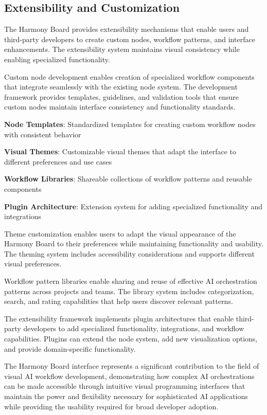 \subsection*{Extensibility and Customization}

The Harmony Board provides extensibility mechanisms that enable users and third-party developers to create custom nodes, workflow patterns, and interface enhancements. The extensibility system maintains visual consistency while enabling specialized functionality.

Custom node development enables creation of specialized workflow components that integrate seamlessly with the existing node system. The development framework provides templates, guidelines, and validation tools that ensure custom nodes maintain interface consistency and functionality standards.

\begin{expandedlist}
    \item \textbf{Node Templates}: Standardized templates for creating custom workflow nodes with consistent behavior
    \item \textbf{Visual Themes}: Customizable visual themes that adapt the interface to different preferences and use cases
    \item \textbf{Workflow Libraries}: Shareable collections of workflow patterns and reusable components
    \item \textbf{Plugin Architecture}: Extension system for adding specialized functionality and integrations
\end{expandedlist}

Theme customization enables users to adapt the visual appearance of the Harmony Board to their preferences while maintaining functionality and usability. The theming system includes accessibility considerations and supports different visual preferences.

Workflow pattern libraries enable sharing and reuse of effective AI orchestration patterns across projects and teams. The library system includes categorization, search, and rating capabilities that help users discover relevant patterns.

The extensibility framework implements plugin architectures that enable third-party developers to add specialized functionality, integrations, and workflow capabilities. Plugins can extend the node system, add new visualization options, and provide domain-specific functionality.

The Harmony Board interface represents a significant contribution to the field of visual AI workflow development, demonstrating how complex AI orchestrations can be made accessible through intuitive visual programming interfaces that maintain the power and flexibility necessary for sophisticated AI applications while providing the usability required for broad developer adoption.
